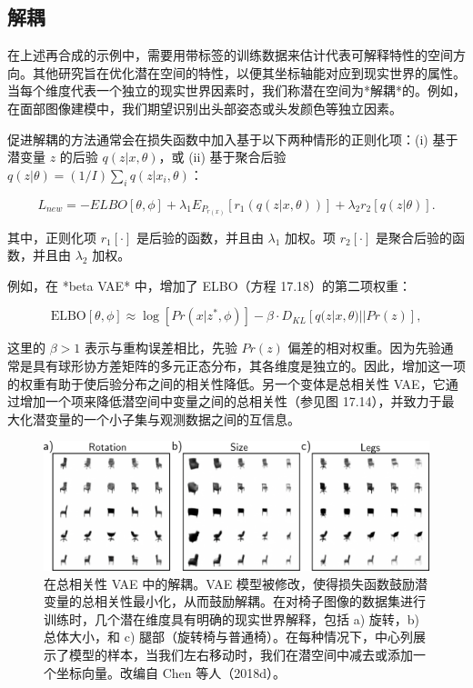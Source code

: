 \subsection{解耦}
在上述再合成的示例中，需要用带标签的训练数据来估计代表可解释特性的空间方向。其他研究旨在优化潜在空间的特性，以便其坐标轴能对应到现实世界的属性。当每个维度代表一个独立的现实世界因素时，我们称潜在空间为*解耦*的。例如，在面部图像建模中，我们期望识别出头部姿态或头发颜色等独立因素。

促进解耦的方法通常会在损失函数中加入基于以下两种情形的正则化项：(i) 基于潜变量 \(z\) 的后验 \(q(z|x, \theta)\)，或 (ii) 基于聚合后验 \(q(z|\theta) = (1/I) \sum_i q(z|x_i, \theta)\)：

\begin{equation}
L_{new} = -ELBO[\theta, \phi] + \lambda_1 E_{P_{r(x)}} [r_1(q(z|x, \theta))] + \lambda_2 r_2 [q(z|\theta)]. 
\end{equation}

其中，正则化项 \(r_1[\cdot]\) 是后验的函数，并且由 \(\lambda_1\) 加权。项 \(r_2[\cdot]\) 是聚合后验的函数，并且由 \(\lambda_2\) 加权。

例如，在 *beta VAE* 中，增加了 ELBO（方程 17.18）的第二项权重：

\begin{equation}
\text{ELBO}[\theta, \phi] \approx \log[Pr(x|z^*, \phi)] - \beta \cdot D_{KL} [q(z|x, \theta) || Pr(z)], 
\end{equation}

这里的 \(\beta > 1\) 表示与重构误差相比，先验 \(Pr(z)\) 偏差的相对权重。因为先验通常是具有球形协方差矩阵的多元正态分布，其各维度是独立的。因此，增加这一项的权重有助于使后验分布之间的相关性降低。另一个变体是总相关性 VAE，它通过增加一个项来降低潜空间中变量之间的总相关性（参见图 17.14），并致力于最大化潜变量的一个小子集与观测数据之间的互信息。

\begin{figure}[ht!]
\centering
\includegraphics[width=0.7\linewidth]{png/chapter17/VAEDisentangle.png}
\caption{在总相关性 VAE 中的解耦。VAE 模型被修改，使得损失函数鼓励潜变量的总相关性最小化，从而鼓励解耦。在对椅子图像的数据集进行训练时，几个潜在维度具有明确的现实世界解释，包括 a) 旋转，b) 总体大小，和 c) 腿部（旋转椅与普通椅）。在每种情况下，中心列展示了模型的样本，当我们左右移动时，我们在潜空间中减去或添加一个坐标向量。改编自 Chen 等人（2018d）。}
\end{figure}


